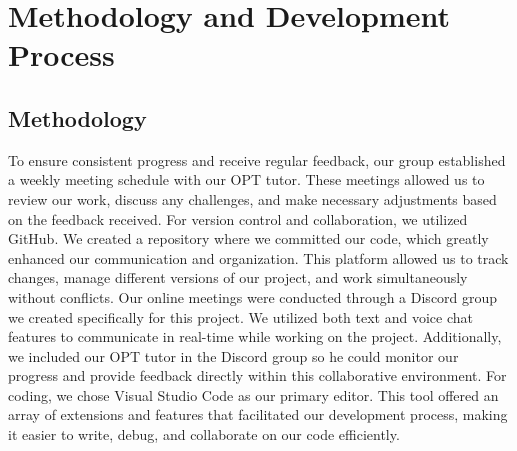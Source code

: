 \documentclass[10pt]{article}
\begin{document}
\section{Methodology and Development Process}

    \subsection{Methodology}
        To ensure consistent progress and receive regular feedback, our group established a weekly meeting schedule with our OPT tutor. These meetings allowed us to review our work, discuss any challenges, and make necessary adjustments based on the feedback received.
        For version control and collaboration, we utilized GitHub. We created a repository where we committed our code, which greatly enhanced our communication and organization. This platform allowed us to track changes, manage different versions of our project, and work simultaneously without conflicts.
        Our online meetings were conducted through a Discord group we created specifically for this project. We utilized both text and voice chat features to communicate in real-time while working on the project. Additionally, we included our OPT tutor in the Discord group so he could monitor our progress and provide feedback directly within this collaborative environment.
        For coding, we chose Visual Studio Code as our primary editor. This tool offered an array of extensions and features that facilitated our development process, making it easier to write, debug, and collaborate on our code efficiently.
\end{document}
